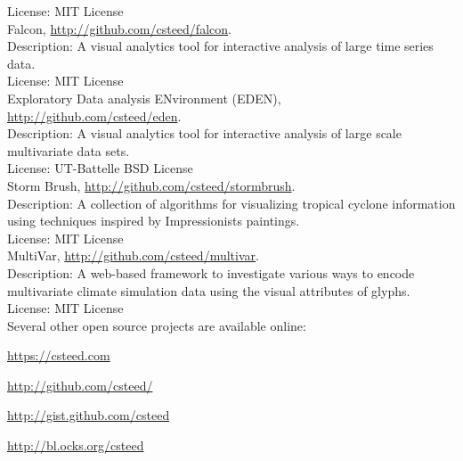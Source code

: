 \documentclass[11pt, letterpaper]{article}
\newcommand{\amper}{{\fontspec[Scale=.95]{Hoefler Text}\selectfont\itshape\&}}
\newcommand{\years}[1]{\marginnote{\scriptsize #1}}
\newenvironment{packed_itemize}{
\begin{itemize}
  \setlength{\itemsep}{1pt}
  \setlength{\parskip}{0pt}
  \setlength{\parsep}{0pt}
}{\end{itemize}}
\begin{document}
License: MIT License\\
\years{2016-2017}Falcon,
\href{http://github.com/csteed/falcon}{http://github.com/csteed/falcon}.\\
Description: A visual analytics tool for interactive analysis of large time series data.\\
License: MIT License\\
\years{2012-2016}Exploratory Data analysis ENvironment (EDEN),
\href{http://github.com/csteed/eden}{http://github.com/csteed/eden}.\\
Description: A visual analytics tool for interactive analysis of large scale multivariate
data sets.\\
License: UT-Battelle BSD License\\
\years{2015}Storm Brush,
\href{http://github.com/csteed/stormbrush}{http://github.com/csteed/stormbrush}.\\
Description: A collection of algorithms for visualizing tropical cyclone
information using techniques inspired by Impressionists paintings.\\
License: MIT License\\
\years{2014}MultiVar,
\href{http://github.com/csteed/multivar}{http://github.com/csteed/multivar}.\\
Description: A web-based framework to investigate various ways to encode
multivariate climate simulation data using the visual attributes of glyphs.\\
License: MIT License\\

Several other open source projects are available online:
\begin{packed_itemize}
\item \href{https://csteed.com}{https://csteed.com}
\item \href{http://github.com/csteed/}{http://github.com/csteed/}
\item \href{http://gist.github.com/csteed}{http://gist.github.com/csteed}
\item \href{http://bl.ocks.org/csteed}{http://bl.ocks.org/csteed}
\end{packed_itemize}

\end{document}
